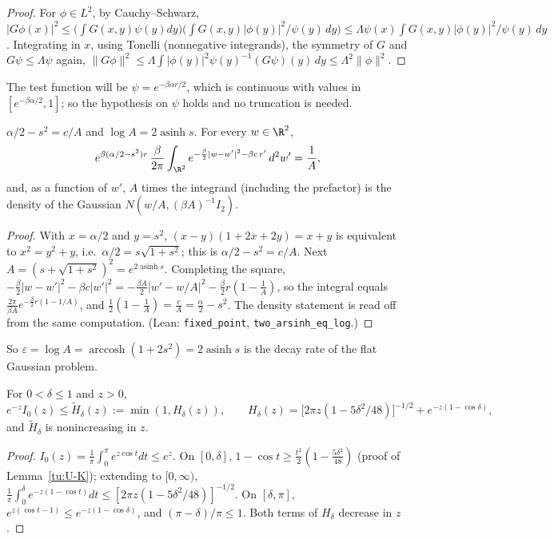 \begin{proof}
For $\phi\in L^2$, by Cauchy--Schwarz,
$|G\phi(x)|^2\le\bigl(\int G(x,y)\psi(y)dy\bigr)\bigl(\int G(x,y)|\phi(y)|^2/\psi(y)\,dy\bigr)\le\Lambda\psi(x)\int G(x,y)|\phi(y)|^2/\psi(y)\,dy$.
Integrating in $x$, using Tonelli (nonnegative integrands), the symmetry of $G$ and $G\psi\le\Lambda\psi$ again,
$\|G\phi\|^2\le\Lambda\int|\phi(y)|^2\psi(y)^{-1}(G\psi)(y)\,dy\le\Lambda^2\|\phi\|^2$.
\end{proof}

The test function will be $\psi=e^{-\beta\alpha r/2}$, which is continuous with values in
$[e^{-\beta\alpha/2},1]$; so the hypothesis on $\psi$ holds and no truncation is needed.

\begin{lemma}\label{tu:U-fixed}
$\alpha/2-s^2=c/A$ and $\log A=2\operatorname{asinh}s$. For every $w\in\R^2$,
\[
e^{\beta(\alpha/2-s^2)r}\,\frac{\beta}{2\pi}\int_{\R^2}e^{-\frac\beta2|w-w'|^2-\beta c\,r'}\,d^2w'=\frac1A ,
\]
and, as a function of $w'$, $A$ times the integrand (including the prefactor) is the density of the Gaussian
$N(w/A,(\beta A)^{-1}I_2)$.
\end{lemma}

\begin{proof}
With $x=\alpha/2$ and $y=s^2$, $(x-y)(1+2x+2y)=x+y$ is equivalent to $x^2=y^2+y$, i.e.\ $\alpha/2=s\sqrt{1+s^2}$; this is
$\alpha/2-s^2=c/A$. Next $A=(s+\sqrt{1+s^2})^2=e^{2\operatorname{asinh}s}$. Completing the square,
$-\frac\beta2|w-w'|^2-\beta c|w'|^2=-\frac{\beta A}2|w'-w/A|^2-\frac\beta2 r(1-\frac1A)$, so the integral equals
$\frac{2\pi}{\beta A}e^{-\frac\beta2r(1-1/A)}$, and $\frac12(1-\frac1A)=\frac cA=\frac\alpha2-s^2$. The density
statement is read off from the same computation. (Lean: \texttt{fixed\_point}, \texttt{two\_arsinh\_eq\_log}.)
\end{proof}

So $\varepsilon=\log A=\operatorname{arccosh}(1+2s^2)=2\operatorname{asinh}s$ is the decay rate of the flat
Gaussian problem.

\begin{lemma}\label{tu:U-bessel}
For $0<\delta\le1$ and $z>0$,
\[
e^{-z}I_0(z)\le\tilde H_\delta(z):=\min(1,H_\delta(z)),\qquad
H_\delta(z)=\bigl[2\pi z(1-5\delta^2/48)\bigr]^{-1/2}+e^{-z(1-\cos\delta)},
\]
and $\tilde H_\delta$ is nonincreasing in $z$.
\end{lemma}

\begin{proof}
$I_0(z)=\frac1\pi\int_0^\pi e^{z\cos t}dt\le e^z$. On $[0,\delta]$, $1-\cos t\ge\frac{t^2}2(1-\frac{5\delta^2}{48})$ (proof of
Lemma~\ref{tu:U-K}); extending to $[0,\infty)$, $\frac1\pi\int_0^\delta e^{-z(1-\cos t)}dt\le[2\pi z(1-5\delta^2/48)]^{-1/2}$. On
$[\delta,\pi]$, $e^{z(\cos t-1)}\le e^{-z(1-\cos\delta)}$, and $(\pi-\delta)/\pi\le1$. Both terms of $H_\delta$ decrease in $z$.
\end{proof}

